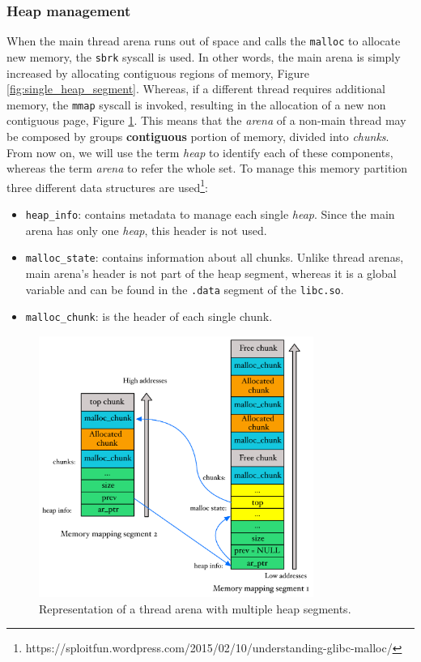 \documentclass{article}
\numberwithin{equation}{subsection}
\begin{document}
\subsubsection{Heap management}
When the main thread arena runs out of space and calls the \texttt{malloc} to allocate new memory, the \texttt{sbrk} syscall is used. In other words, the main arena is simply increased by allocating contiguous regions of memory, Figure \ref{fig:single_heap_segment}. Whereas, if a different thread requires additional memory, the \texttt{mmap} syscall is invoked, resulting in the allocation of a new non contiguous page, Figure \ref{fig:multiple_heap_segments}. This means that the \emph{arena} of a non-main thread may be composed by groups \textbf{contiguous} portion of memory, divided into \emph{chunks}. From now on, we will use the term \emph{heap} to identify each of these components, whereas the term \emph{arena} to refer the whole set. To manage this memory partition three different data structures are used\footnote{https://sploitfun.wordpress.com/2015/02/10/understanding-glibc-malloc/}:
\begin{itemize}
    \item \texttt{heap\_info}: contains metadata to manage each single \emph{heap}. Since the main arena has only one \emph{heap}, this header is not used.
    \item \texttt{malloc\_state}: contains information about all chunks. Unlike thread arenas, main arena's header is not part of the heap segment, whereas it is a global variable and can be found in the \texttt{.data} segment of the \texttt{libc.so}.
    \item \texttt{malloc\_chunk}: is the header of each single chunk.
\end{itemize}
\begin{figure}[htb]
    \centering
    \includegraphics[width=0.80\textwidth]{multiple_heap_segments.pdf}
    \caption{Representation of a thread arena with multiple heap segments.}
    \label{fig:multiple_heap_segments}
\end{figure}
\end{document}
